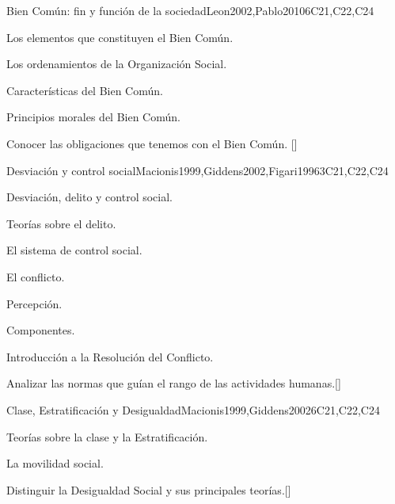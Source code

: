 \begin{syllabus}
\begin{unit}{}{Bien Común: fin y función de la sociedad}{Leon2002,Pablo2010}{6}{C21,C22,C24}
\begin{topics}
    \item Los elementos que constituyen el Bien Común.
    \item Los ordenamientos de la Organización Social.
    \item Características del Bien Común.
    \item Principios morales del Bien Común.
\end{topics}
\begin{learningoutcomes}
    \item Conocer las obligaciones que tenemos con el Bien Común. [\Familiarity]
\end{learningoutcomes}
\end{unit}

\begin{unit}{}{Desviación y control social}{Macionis1999,Giddens2002,Figari1996}{3}{C21,C22,C24}
\begin{topics}
    \item Desviación, delito  y control social.
    \item Teorías sobre el delito.
    \item El sistema de control social.
    \item El conflicto.
    \begin{subtopics}
	    \item Percepción.
	    \item Componentes.
    \end{subtopics}
    \item Introducción a la Resolución del Conflicto.
\end{topics}
\begin{learningoutcomes}
    \item Analizar las normas que guían el rango de las actividades humanas.[\Familiarity]
\end{learningoutcomes}
\end{unit}

\begin{unit}{}{Clase, Estratificación y Desigualdad}{Macionis1999,Giddens2002}{6}{C21,C22,C24}
\begin{topics}
    \item Teorías sobre la clase y la  Estratificación.
    \item La movilidad social.
\end{topics}
\begin{learningoutcomes}
	\item Distinguir la Desigualdad Social y sus principales teorías.[\Familiarity]
\end{learningoutcomes}
\end{unit}


\end{syllabus}
